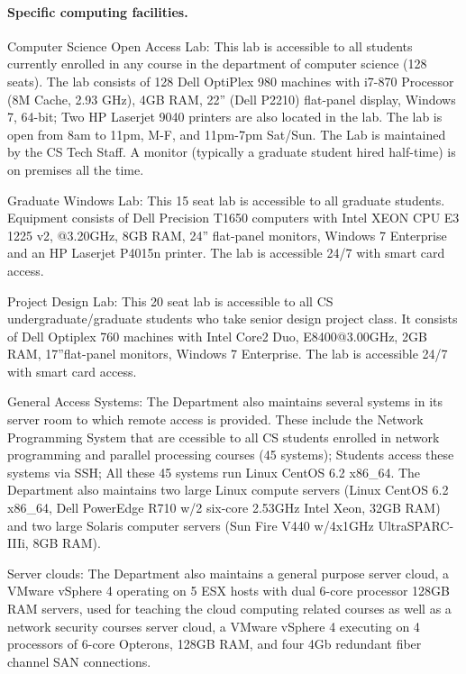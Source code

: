 \documentclass[10pt,letterpaper]{article}
\begin{document}
\paragraph{Specific computing facilities.} Computer Science Open Access Lab: This lab is accessible to all students currently enrolled in any course in the department of computer science (128 seats). The lab consists of 128 Dell OptiPlex 980 machines with i7-870 Processor (8M Cache, 2.93 GHz), 4GB RAM, 22'' (Dell P2210) flat-panel display, Windows 7, 64-bit; Two HP Laserjet 9040 printers are also located in the lab. The lab is open from 8am to 11pm, M-F, and 11pm-7pm Sat/Sun. The Lab is maintained by the CS Tech Staff. A monitor (typically a graduate student hired half-time) is on premises all the time.

Graduate Windows Lab: This 15 seat lab is accessible to all graduate students.  Equipment consists of Dell Precision T1650 computers with Intel XEON CPU E3 1225 v2, @3.20GHz, 8GB RAM, 24'' flat-panel monitors, Windows 7 Enterprise and an HP Laserjet P4015n printer. The lab is accessible 24/7 with smart card access.

Project Design Lab: This 20 seat lab is accessible to all CS undergraduate/graduate students who take senior design project class. It consists of  Dell Optiplex 760 machines with Intel Core2 Duo, E8400@3.00GHz, 2GB RAM, 17''flat-panel monitors, Windows 7 Enterprise. The lab is accessible 24/7 with smart card access.

General Access Systems: The Department also maintains several systems in its server room to which remote access is provided. These include the Network Programming System that are ccessible to all CS students enrolled in network programming and parallel processing courses (45 systems); Students access these systems via SSH; All these 45 systems run Linux CentOS 6.2 x86\_64. The Department also maintains two large Linux compute servers (Linux CentOS 6.2 x86\_64, Dell PowerEdge R710 w/2 six-core 2.53GHz Intel Xeon, 32GB RAM) and two large Solaris computer servers (Sun Fire V440 w/4x1GHz UltraSPARC-IIIi, 8GB RAM). 

Server clouds: The Department also maintains a general purpose server cloud, a VMware vSphere 4 operating on 5 ESX hosts with dual 6-core processor 128GB RAM servers, used for teaching the cloud computing related courses as well as a network security courses server cloud,  a VMware vSphere 4 executing on 4 processors of 6-core Opterons, 128GB RAM, and four 4Gb redundant fiber channel SAN connections.
\end{document}
